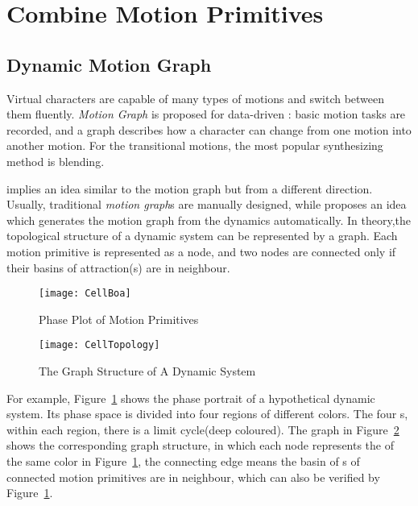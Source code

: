 \section{Combine Motion Primitives}
\label{sec:manyprimitive}

\subsection{Dynamic Motion Graph}
Virtual characters are capable of many types of motions and switch between them fluently.
\emph{Motion Graph}\citep{kovar2008motion} is proposed for data-driven \cms:
basic motion tasks are recorded, and a graph describes how a character can change from one motion into another motion. 
For the transitional motions, the most popular synthesizing method is blending.


\moit implies an idea similar to the motion graph but from a different direction.
Usually, traditional \emph{motion graph}s are manually designed, while \moit proposes an idea which generates the motion graph from the dynamics automatically.
In theory,the topological structure of a dynamic system can be represented by a  graph.
Each motion primitive is represented as a node, and two nodes are connected only if their basins of attraction({\boa}s) are in neighbour.

\begin{figure}[!htbp]
  \begin{center}
	\texttt{[image: CellBoa]}
    \caption{Phase Plot of Motion Primitives}
    \label{fig:manyprimitives}
  \end{center}
\end{figure}


\begin{figure}[!htbp]
  \begin{center}
      \texttt{[image: CellTopology]}
    \caption{The Graph Structure of A Dynamic System}
    \label{fig:manyprimitivesgraph}
  \end{center}
\end{figure}

For example, Figure~\ref{fig:manyprimitives} shows the phase portrait of a hypothetical dynamic system.
Its phase space is divided into four regions of different colors.
The four \boa s, within each region, there is a limit cycle(deep coloured).
The graph in Figure~\ref{fig:manyprimitivesgraph} shows the corresponding graph structure, in which each node represents the \boa of the same color in Figure~\ref{fig:manyprimitives}, the connecting edge means the basin of {\boa}s of connected motion primitives are in neighbour, which can also be verified by Figure~\ref{fig:manyprimitives}.


